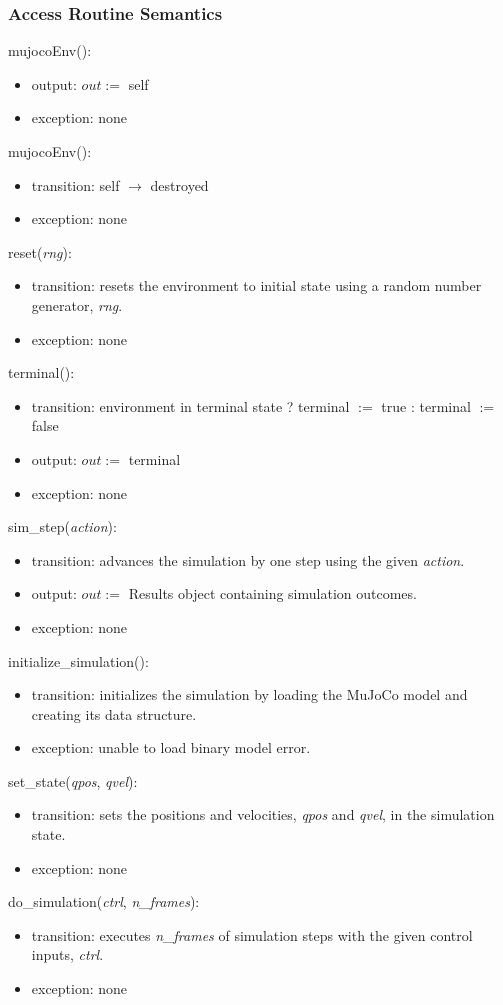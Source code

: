 \documentclass[12pt, titlepage]{article}
\begin{document}
\subsubsection{Access Routine Semantics}
\noindent mujocoEnv():
\begin{itemize}
\item output: $out :=$ self
\item exception: none
\end{itemize}
\noindent \texttildelow mujocoEnv():
\begin{itemize}
\item transition: self $\rightarrow$ destroyed
\item exception: none 
\end{itemize}
\noindent reset(\textit{rng}):
\begin{itemize}
\item transition: resets the environment to initial state using a random number generator, \textit{rng}.
\item exception: none
\end{itemize}
\noindent terminal():
\begin{itemize}
\item transition: environment in terminal state ? terminal $:=$ true : terminal $:=$ false
\item output: $out :=$ terminal
\item exception: none
\end{itemize}
\noindent sim\_step(\textit{action}):
\begin{itemize}
\item transition: advances the simulation by one step using the given \textit{action}.
\item output: $out :=$ Results object containing simulation outcomes.
\item exception: none
\end{itemize}
\noindent initialize\_simulation():
\begin{itemize}
\item transition: initializes the simulation by loading the MuJoCo model and creating its data structure.
\item exception: unable to load binary model error.
\end{itemize}
\noindent set\_state(\textit{qpos}, \textit{qvel}):
\begin{itemize}
\item transition: sets the positions and velocities, \textit{qpos} and \textit{qvel}, in the simulation state.
\item exception: none
\end{itemize}
\noindent do\_simulation(\textit{ctrl}, \textit{n\_frames}):
\begin{itemize}
\item transition: executes \textit{n\_frames} of simulation steps with the given control inputs, \textit{ctrl}.
\item exception: none 
\end{itemize}
\end{document}
